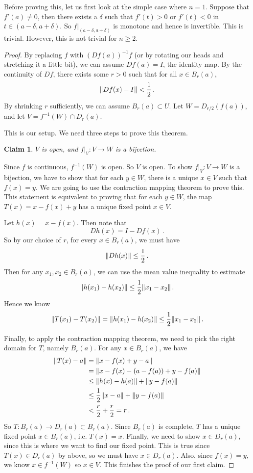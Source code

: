 \documentclass{article}
\theoremstyle{plain}\theoremheaderfont{\normalfont\itshape}\theorembodyfont{\rmfamily}\theoremseparator{.}\newtheorem*{rem}{Remark}\newtheorem*{ex}{Example}\newtheorem*{proof}{Proof}\newtheorem*{altp}{Alternative proof}
\theoremstyle{plain}\theoremheaderfont{\normalfont\bfseries}\theorembodyfont{\rmfamily}\theoremseparator{.}\newtheorem{thm}{Theorem}[section]\newtheorem{lem}[thm]{Lemma}\newtheorem{prop}[thm]{Proposition}\newtheorem*{cor}{Corollary}\newtheorem{defn}[thm]{Definition}\newtheorem{clm}[thm]{Claim}\newtheorem{clminproof}{Claim}
\theoremstyle{break}\theoremheaderfont{\normalfont\itshape}\theorembodyfont{\rmfamily}\theoremseparator{.\medskip}\newtheorem*{proofskip}{Proof}\newtheorem*{exs}{Examples}\newtheorem*{rems}{Remarks}
\theoremstyle{break}\theoremheaderfont{\normalfont\bfseries}\theorembodyfont{\rmfamily}\theoremseparator{.\medskip}\newtheorem{lemskip}[thm]{Lemma}\newtheorem{defnskip}[thm]{Definition}\newtheorem{propskip}[thm]{Proposition}\newtheorem{thmskip}[thm]{Theorem}
\begin{document}
    Before proving this, let us first look at the simple case where \(n=1\). Suppose that \(f'(a)\ne 0\), then there exists a \(\delta\) such that \(f'(t)>0\) or \(f'(t)<0\) in \(t\in(a-\delta,a+\delta)\). So \(f|_{(a-\delta,a+\delta)}\) is monotone and hence is invertible. This is trivial. However, this is not trivial for \(n\ge 2\).
    \begin{proof}
        By replacing \(f\) with \((Df(a))^{-1}f\) (or by rotating our heads and stretching it a little bit), we can assume \(Df(a)=I\), the identity map. By the continuity of \(Df\), there exists some \(r>0\) such that for all \(x\in B_r(a)\),
        \[\norm{Df(x)-I}<\frac{1}{2}\,.\]
        By shrinking \(r\) sufficiently, we can assume \(B_r(a)\subset U\). Let \(W=D_{r/2}(f(a))\), and let \(V=f^{-1}(W)\cap D_r(a)\).

        This is our setup. We need three steps to prove this theorem.

        \begin{clminproof}
            \(V\) is open, and \(f|_V:V\to W\) is a bijection.
        \end{clminproof}
        Since \(f\) is continuous, \(f^{-1}(W)\) is open. So \(V\) is open. To show \(f|_V:V\to W\) is a bijection, we have to show that for each \(y\in W\), there is a unique \(x\in V\) such that \(f(x)=y\). We are going to use the contraction mapping theorem to prove this. This statement is equivalent to proving that for each \(y\in W\), the map \(T(x)=x-f(x)+y\) has a unique fixed point \(x\in V\).

        Let \(h(x)=x-f(x)\). Then note that
        \[Dh(x)=I-Df(x)\,.\]
        So by our choice of \(r\), for every \(x\in B_r(a)\), we must have
        \[\norm{Dh(x)}\le\frac{1}{2}\,.\]
        Then for any \(x_1,x_2\in B_r(a)\), we can use the mean value inequality to estimate
        \[\norm{h(x_1)-h(x_2)}\le\frac{1}{2}\norm{x_1-x_2}\,.\]
        Hence we know
        \[\norm{T(x_1)-T(x_2)}=\norm{h(x_1)-h(x_2)}\le\frac{1}{2}\norm{x_1-x_2}\,.\]

        Finally, to apply the contraction mapping theorem, we need to pick the right domain for \(T\), namely \(B_r(a)\). For any \(x\in B_r(a)\), we have
        \begin{align*}
            \norm{T(x)-a}&=\norm{x-f(x)+y-a}\\
            &=\norm{x-f(x)-(a-f(a))+y-f(a)}\\
            &\le\norm{h(x)-h(a)}+\norm{y-f(a)}\\
            &\le\frac{1}{2}\norm{x-a}+\norm{y-f(a)}\\
            &<\frac{r}{2}+\frac{r}{2}=r\,.
        \end{align*}
        So \(T:B_r(a)\to D_r(a)\subset B_r(a)\). Since \(B_r(a)\) is complete, \(T\) has a unique fixed point \(x\in B_r(a)\), i.e. \(T(x)=x\). Finally, we need to show \(x\in D_r(a)\), since this is where we want to find our fixed point. This is true since \(T(x)\in D_r(a)\) by above, so we must have \(x\in D_r(a)\). Also, since \(f(x)=y\), we know \(x\in f^{-1}(W)\) so \(x\in V\). This finishes the proof of our first claim.


\end{proof}
\end{document}
